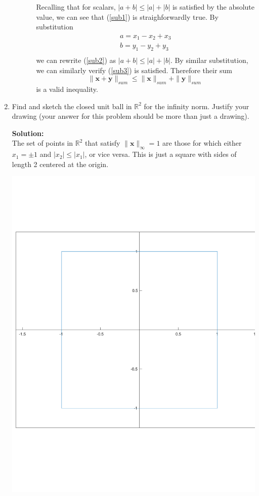 \documentclass[]{article}
\newcommand{\R}{\mathbb{R}}
\newcommand\nsum[1]{\| #1 \|_{sum}}
\newcommand{\solution}{\vskip 0.5cm \textbf{\large Solution:} \\}
\begin{document}
\begin{enumerate}[resume]
\begin{enumerate}
\begin{enumerate}
            Recalling that for scalars, $|a + b| \leq |a| + |b|$ is
            satisfied by the absolute value, we can see that
            (\ref{sub1}) is straighforwardly true. By substitution
            \begin{gather*}
              a = x_1 - x_2 + x_3 \\
              b = y_1 - y_2 + y_3 \\
            \end{gather*}
            we can rewrite (\ref{sub2}) as $|a + b| \leq |a| +
            |b|$. By similar substitution, we can similarly verify
            (\ref{sub3}) is satisfied. Therefore their sum
            \[
            \nsum{\bm{x} + \bm{y}} \leq \nsum{\bm{x}} + \nsum{\bm{y}}
            \]
            is a valid inequality.
          \end{enumerate}
	\end{enumerate}

  \item Find and sketch the closed unit ball in $\R^2$ for the
    infinity norm. Justify your drawing (your answer for this problem
    should be more than just a drawing).
    
	\solution The set of points in $\R^2$ that satisfy $\| \bm{x}
    \|_{\infty} = 1$ are those for which either $x_1 = \pm 1$ and
    $|x_2| \leq |x_1|$, or vice versa. This is just a square with
    sides of length 2 centered at the origin.

    \begin{center}
      \includegraphics[scale=0.4]{unit_sphere_supnorm.pdf}
    \end{center}



\end{enumerate}
\end{document}
